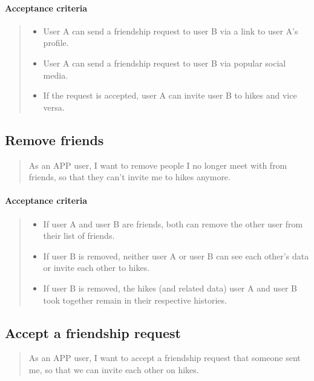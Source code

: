 \paragraph*{Acceptance criteria}
\begin{quote}
\begin{itemize}
    \item User A can send a friendship request to user B via a link to user A's profile.
    \item User A can send a friendship request to user B via popular social media.
    \item If the request is accepted, user A can invite user B to hikes and vice versa.
\end{itemize}
\end{quote}

\subsection{Remove friends}\label{US:friends-remove}
\begin{quote}
As an APP user, I want to remove people I no longer meet with from friends, so that they can't invite me to hikes anymore.
\end{quote}

\paragraph*{Acceptance criteria}
\begin{quote}
\begin{itemize}
    \item If user A and user B are friends, both can remove the other user from their list of friends.
    \item If user B is removed, neither user A or user B can see each other's data or invite each other to hikes.
    \item If user B is removed, the hikes (and related data) user A and user B took together remain in their respective histories.
\end{itemize}
\end{quote}

\subsection{Accept a friendship request}\label{US:friends-accept}
\begin{quote}
As an APP user, I want to accept a friendship request that someone sent me, so that we can invite each other on hikes.
\end{quote}

